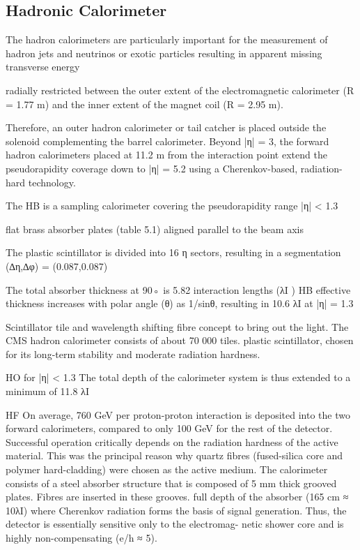 \subsection{Hadronic Calorimeter}

The hadron calorimeters are particularly important for the measurement of hadron jets and neutrinos or exotic particles resulting in apparent missing transverse energy~\cite{CMS-Proposal}

radially restricted between the outer extent of the electromagnetic calorimeter (R = 1.77 m) and the inner extent of the magnet coil (R = 2.95 m).

Therefore, an outer hadron calorimeter or tail catcher is placed outside the solenoid complementing the barrel calorimeter. Beyond |η| = 3, the forward hadron calorimeters placed at 11.2 m from the interaction point extend the pseudorapidity coverage down to |η| = 5.2 using a Cherenkov-based, radiation-hard technology.

The HB is a sampling calorimeter covering the pseudorapidity range |η| < 1.3

flat brass absorber plates (table 5.1) aligned parallel to the beam axis

The plastic scintillator is divided into 16 η sectors, resulting in a segmentation (∆η,∆φ) = (0.087,0.087)

The total absorber thickness at 90◦ is 5.82 interaction lengths (λI ) HB effective thickness increases with polar angle (θ) as 1/sinθ, resulting in 10.6 λI at |η| = 1.3

Scintillator tile and wavelength shifting fibre concept to bring out the light. The CMS hadron calorimeter consists of about 70 000 tiles. plastic scintillator, chosen for its long-term stability and moderate radiation hardness.
 


HO
for |η| < 1.3
The total depth of the calorimeter system is thus extended to a minimum of 11.8 λI

HF
On average, 760 GeV per proton-proton interaction is deposited into the two forward calorimeters, compared to only 100 GeV for the rest of the detector.
Successful operation critically depends on the radiation hardness of the active material. This was the principal reason why quartz fibres (fused-silica core and polymer hard-cladding) were chosen as the active medium.
The calorimeter consists of a steel absorber structure that is composed of 5 mm thick grooved
plates. Fibres are inserted in these grooves.
full depth of the absorber (165 cm ≈ 10λI)
where Cherenkov radiation forms the basis of signal generation. Thus, the detector is essentially sensitive only to the electromag- netic shower core and is highly non-compensating (e/h ≈ 5).




